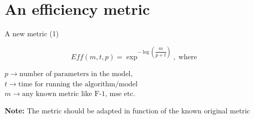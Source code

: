 \section{An efficiency metric}

\begin{frame}{A new metric (1)}

    \begin{mdframed}[style=box]
        $$Eff(m,t,p) = \exp^{-\log \left( \dfrac{m}{p+t}\right)}, \;\text{where}$$
    \end{mdframed}

    \vspace{0.5cm}
    
    $p \rightarrow \text{number of parameters in the model},$
    $t \rightarrow \text{time for running the algorithm/model}$
    $m \rightarrow \text{any known metric like F-1, mse etc.}$
    
    \vspace{0.5cm}
    
    \textbf{Note: }The metric should be adapted in function of the known original metric
    
\end{frame}


